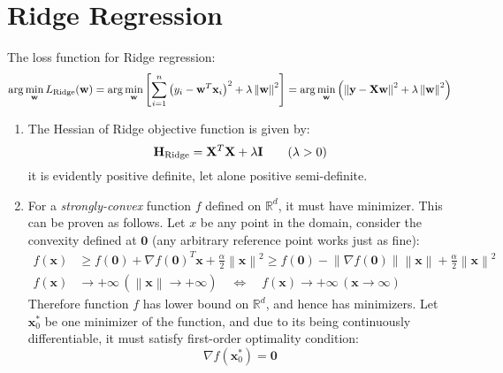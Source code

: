 \documentclass[a4paper, 10pt]{article}
\newcommand{\annot}[1]{{\rm #1}}
\begin{document}
\section{Ridge Regression}

The loss function for Ridge regression:
\begin{equation}
    \arg\min_{\mathbf{w}}L_{\annot{Ridge}}(\mathbf{w}) = \arg\min_{\mathbf{w}} \left[\sum_{i=1}^n \left(y_i - \mathbf{w}^T \mathbf{x}_i\right)^2 + \lambda \left\|\mathbf{w}\right\|^2\right] = \arg\min_{\mathbf{w}} \left(\left\|\mathbf{y} - \mathbf{X} \mathbf{w}\right\|^2 + \lambda \left\|\mathbf{w}\right\|^2\right)
\end{equation}

\begin{enumerate}[label=(\alph*)]
    \item The Hessian of Ridge objective function is given by:
    \begin{equation}
        \mathbf{H}_{\annot{Ridge}} = \mathbf{X}^T \mathbf{X} + \lambda \mathbf{I}\qquad (\lambda > 0)
    \end{equation}
    it is evidently positive definite, let alone positive semi-definite.
    \item For a \textit{strongly-convex} function $f$ defined on $\mathbb{R}^d$, it must have minimizer. This can be proven as follows. Let $x$ be any point in the domain, consider the convexity defined at $\mathbf{0}$ (any arbitrary reference point works just as fine):
    \begin{equation}
        \begin{aligned}
            f(\mathbf{x}) &\geq f(\mathbf{0}) + \nabla f(\mathbf{0})^T \mathbf{x} + \frac{\alpha}{2} \left\| \mathbf{x} \right\|^2 \geq f(\mathbf{0}) - \left\|\nabla f(\mathbf{0})\right\| \left\|\mathbf{x}\right\| + \frac{\alpha}{2} \left\| \mathbf{x}\right\|^2 \\ 
            f(\mathbf{x}) &\rightarrow +\infty \, (\left\|\mathbf{x} \right\| \rightarrow +\infty) \quad \Longleftrightarrow \quad f(\mathbf{x}) \rightarrow +\infty \, (\mathbf{x} \rightarrow \infty)
        \end{aligned}
    \end{equation}
    Therefore function $f$ has lower bound on $\mathbb{R}^d$, and hence has minimizers. Let $\mathbf{x}^*_0$ be one minimizer of the function, and due to its being continuously differentiable, it must satisfy first-order optimality condition:
    \begin{equation}
        \nabla f(\mathbf{x}^*_0) = \mathbf{0}
    \end{equation}
    

\end{enumerate}
\end{document}
